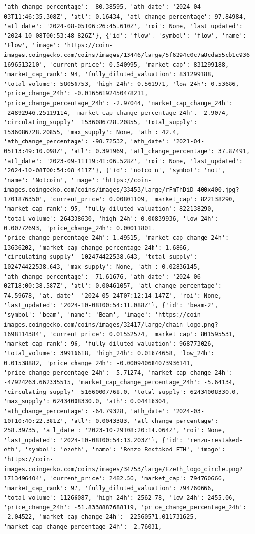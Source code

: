 \documentclass[
  letterpaper,
  DIV=11,
  numbers=noendperiod]{scrreprt}
\begin{document}
\begin{verbatim}
'ath_change_percentage': -80.38595, 'ath_date': '2024-04-03T11:46:35.308Z', 'atl': 0.16434, 'atl_change_percentage': 97.84984, 'atl_date': '2024-08-05T06:26:45.610Z', 'roi': None, 'last_updated': '2024-10-08T00:53:48.826Z'}, {'id': 'flow', 'symbol': 'flow', 'name': 'Flow', 'image': 'https://coin-images.coingecko.com/coins/images/13446/large/5f6294c0c7a8cda55cb1c936_Flow_Wordmark.png?1696513210', 'current_price': 0.540995, 'market_cap': 831299188, 'market_cap_rank': 94, 'fully_diluted_valuation': 831299188, 'total_volume': 58056753, 'high_24h': 0.561971, 'low_24h': 0.53686, 'price_change_24h': -0.01656192450478211, 'price_change_percentage_24h': -2.97044, 'market_cap_change_24h': -24892946.25119114, 'market_cap_change_percentage_24h': -2.9074, 'circulating_supply': 1536086728.20855, 'total_supply': 1536086728.20855, 'max_supply': None, 'ath': 42.4, 'ath_change_percentage': -98.72532, 'ath_date': '2021-04-05T13:49:10.098Z', 'atl': 0.391969, 'atl_change_percentage': 37.87491, 'atl_date': '2023-09-11T19:41:06.528Z', 'roi': None, 'last_updated': '2024-10-08T00:54:08.411Z'}, {'id': 'notcoin', 'symbol': 'not', 'name': 'Notcoin', 'image': 'https://coin-images.coingecko.com/coins/images/33453/large/rFmThDiD_400x400.jpg?1701876350', 'current_price': 0.00801109, 'market_cap': 822138290, 'market_cap_rank': 95, 'fully_diluted_valuation': 822138290, 'total_volume': 264338630, 'high_24h': 0.00839936, 'low_24h': 0.00772693, 'price_change_24h': 0.00011801, 'price_change_percentage_24h': 1.49515, 'market_cap_change_24h': 13636202, 'market_cap_change_percentage_24h': 1.6866, 'circulating_supply': 102474422538.643, 'total_supply': 102474422538.643, 'max_supply': None, 'ath': 0.02836145, 'ath_change_percentage': -71.61676, 'ath_date': '2024-06-02T18:00:38.587Z', 'atl': 0.00461057, 'atl_change_percentage': 74.59678, 'atl_date': '2024-05-24T07:12:14.147Z', 'roi': None, 'last_updated': '2024-10-08T00:54:11.088Z'}, {'id': 'beam-2', 'symbol': 'beam', 'name': 'Beam', 'image': 'https://coin-images.coingecko.com/coins/images/32417/large/chain-logo.png?1698114384', 'current_price': 0.01552574, 'market_cap': 801595531, 'market_cap_rank': 96, 'fully_diluted_valuation': 968773026, 'total_volume': 39916618, 'high_24h': 0.01674658, 'low_24h': 0.01538882, 'price_change_24h': -0.000940684073936141, 'price_change_percentage_24h': -5.71274, 'market_cap_change_24h': -47924263.662335515, 'market_cap_change_percentage_24h': -5.64134, 'circulating_supply': 51660007768.0, 'total_supply': 62434008330.0, 'max_supply': 62434008330.0, 'ath': 0.04416304, 'ath_change_percentage': -64.79328, 'ath_date': '2024-03-10T10:40:22.381Z', 'atl': 0.0043383, 'atl_change_percentage': 258.39735, 'atl_date': '2023-10-29T08:20:14.064Z', 'roi': None, 'last_updated': '2024-10-08T00:54:13.203Z'}, {'id': 'renzo-restaked-eth', 'symbol': 'ezeth', 'name': 'Renzo Restaked ETH', 'image': 'https://coin-images.coingecko.com/coins/images/34753/large/Ezeth_logo_circle.png?1713496404', 'current_price': 2482.56, 'market_cap': 794760666, 'market_cap_rank': 97, 'fully_diluted_valuation': 794760666, 'total_volume': 11266087, 'high_24h': 2562.78, 'low_24h': 2455.06, 'price_change_24h': -51.8338887688119, 'price_change_percentage_24h': -2.04522, 'market_cap_change_24h': -22560571.011731625, 'market_cap_change_percentage_24h': -2.76031, 
\end{verbatim}
\end{document}
